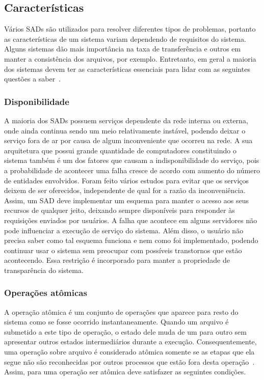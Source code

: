 	\subsection{Características}
	
	Vários SADs são utilizados para resolver diferentes tipos de problemas, portanto as características de um sistema variam dependendo de requisitos do sistema. Alguns sistemas dão mais importância na taxa de transferência e outros em manter a consistência dos arquivos, por exemplo. Entretanto, em geral a maioria dos sistemas devem ter as características essenciais para lidar com as seguintes questões a saber~\cite{tanenbaum07,coulouris06, galli00, kon94}.
	
	\subsubsection{Disponibilidade}
	A maioria dos SADs possuem serviços dependente da rede interna ou externa, onde ainda continua sendo um meio relativamente instável, podendo deixar o serviço fora de ar por causa de algum inconveniente que ocorreu na rede. A sua arquitetura que possui grande quantidade de computadores constituindo o sistema também é um dos fatores que causam a indisponibilidade do serviço, pois a probabilidade de acontecer uma falha cresce de acordo com aumento do número de entidades envolvidos. Foram feito vários estudos para evitar que os serviços deixem de ser oferecidos, independente de qual for a razão da inconveniência. Assim, um SAD deve implementar um esquema para manter o acesso aos seus recursos de qualquer jeito, deixando sempre disponíveis para responder às requisições enviados por usuários. A falha que acontece em alguns servidores não pode influenciar a execução de serviço do sistema. Além disso, o usuário não precisa saber como tal esquema funciona e nem como foi implementado, podendo continuar usar o sistema sem preocupar com possíveis transtornos que estão acontecendo. Essa restrição é incorporado para manter a propriedade de transparência do sistema.
	
	\subsubsection{Operações atômicas}
	A operação atômica é um conjunto de operações que aparece para resto do sistema como se fosse ocorrido instantaneamente.
	Quando um arquivo é submetido a este tipo de operação, o estado dele muda de um para outro sem apresentar outros estados intermediários durante a execução.
	Consequentemente, uma operação sobre arquivo é considerado atômica somente se as etapas que ela segue não são reconhecidas por outros processos que estão fora desta operação~\cite{tanenbaum07_2}. 
	Assim, para uma operação ser atômica deve satisfazer as seguintes condições.
	
